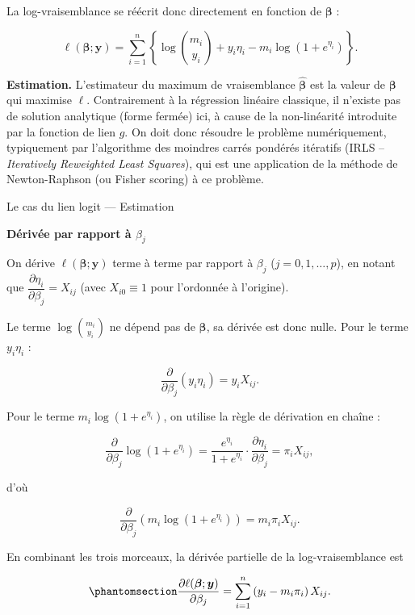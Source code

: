 \documentclass[
  french,
  letterpaper,
  DIV=11,
  numbers=noendperiod]{scrreprt}
\begin{document}
La log-vraisemblance se réécrit donc directement en fonction de
\(\boldsymbol{\beta}\) :

\[
\ell(\boldsymbol{\beta}; \boldsymbol{y}) = \sum_{i=1}^n \left\{ \log\binom{m_i}{y_i} + y_i \eta_i - m_i \log\left(1+e^{\eta_i}\right) \right\}.
\]

\textbf{Estimation.} L'estimateur du maximum de vraisemblance
\(\hat{\boldsymbol{\beta}}\) est la valeur de \(\boldsymbol{\beta}\) qui
maximise \(\ell\). Contrairement à la régression linéaire classique, il
n'existe pas de solution analytique (forme fermée) ici, à cause de la
non-linéarité introduite par la fonction de lien \(g\). On doit donc
résoudre le problème numériquement, typiquement par l'algorithme des
moindres carrés pondérés itératifs (IRLS -- \emph{Iteratively Reweighted
Least Squares}), qui est une application de la méthode de Newton-Raphson
(ou Fisher scoring) à ce problème.

{Le cas du lien logit --- Estimation}

\textbf{Dérivée par rapport à \(\beta_j\)}

On dérive \(\ell(\boldsymbol{\beta}; \boldsymbol{y})\) terme à terme par
rapport à \(\beta_j\) (\(j = 0, 1, \dots, p\)), en notant que
\(\dfrac{\partial \eta_i}{\partial \beta_j} = X_{ij}\) (avec
\(X_{i0} \equiv 1\) pour l'ordonnée à l'origine).

Le terme \(\log\binom{m_i}{y_i}\) ne dépend pas de
\(\boldsymbol{\beta}\), sa dérivée est donc nulle. Pour le terme
\(y_i \eta_i\) :

\[
\frac{\partial}{\partial \beta_j}\left( y_i \eta_i \right) = y_i X_{ij}.
\]

Pour le terme \(m_i \log(1+e^{\eta_i})\), on utilise la règle de
dérivation en chaîne :

\[
\frac{\partial}{\partial \beta_j} \log\left(1+e^{\eta_i}\right)
= \frac{e^{\eta_i}}{1+e^{\eta_i}} \cdot \frac{\partial \eta_i}{\partial \beta_j}
= \pi_i X_{ij},
\]

d'où

\[
\frac{\partial}{\partial \beta_j}\left( m_i \log(1+e^{\eta_i}) \right) = m_i \pi_i X_{ij}.
\]

En combinant les trois morceaux, la dérivée partielle de la
log-vraisemblance est

\begin{equation}\protect\phantomsection\label{eq-score-logit}{
\frac{\partial \ell(\boldsymbol{\beta}; \boldsymbol{y})}{\partial \beta_j} = \sum_{i=1}^n \left( y_i - m_i \pi_i \right) X_{ij}.
}\end{equation}
\end{document}
